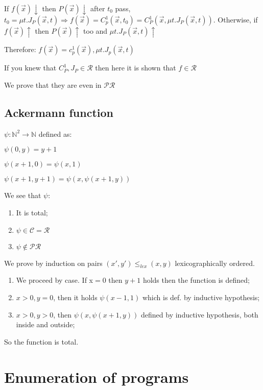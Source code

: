 \documentclass{amsbook}
\newcommand{\nat}{\ensuremath{\mathbb{N}}}
\theoremstyle{definition}
\theoremstyle{remark}
\numberwithin{section}{chapter}
\numberwithin{equation}{chapter}
\begin{document}
If $ f(\vec{x})\downarrow $ then $ P(\vec{x})\downarrow $ after $ t_0 $ pass, $ t_0 = \mu t. J_P(\vec{x},t) \Rightarrow f(\vec{x}) = C_p^1(\vec{x},t_0) = C_P^1(\vec{x}, \mu t.J_P(\vec{x},t)) $.
Otherwise, if $ f(\vec{x})\uparrow $ then $P(\vec{x})\uparrow$ too and $ \mu t.J_P(\vec{x},t)\uparrow $

Therefore:
$f(\vec{x}) = c_p^1(\vec{x}),\mu t.J_p(\vec{x},t)$


If you knew that $ C_P^1, J_P \in \mathcal{R} $ then here it is shown that $ f \in \mathcal{R} $

We prove that they are even in $ \mathcal{PR} $

\section{Ackermann function}
$ \psi: \nat^2 \rightarrow \nat $ defined as:

$ \psi(0,y) = y+1 $

$ \psi(x+1,0) = \psi(x,1) $

$ \psi(x+1,y+1) = \psi(x, \psi(x+1, y)) $

We see that $ \psi $:
\begin{enumerate}
	\item It is total;
	\item $ \psi \in \mathcal{C} = \mathcal{R} $
	\item $ \psi \not \in \mathcal{PR} $
\end{enumerate}

We prove by induction on pairs $ (x',y') \leq_{lex} (x,y) $ lexicographically ordered.

\begin{enumerate}
	\item We proceed by case. If x$ = 0$ then $y + 1$ holds then the function is defined;
	\item $ x>0, y=0 $, then it holds $ \psi(x-1,1) $ which is def. by inductive hypothesis;
	\item $ x>0, y>0 $, then $ \psi(x, \psi(x+1, y)) $ defined by inductive hypothesis, both inside and outside;
\end{enumerate}

So the function is total.

\chapter{Enumeration of programs}
\end{document}
